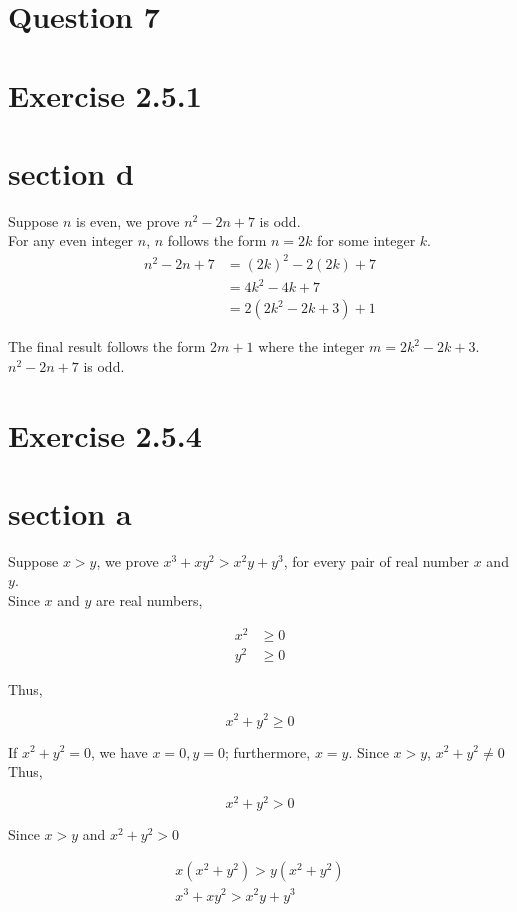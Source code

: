 \documentclass[10pt]{article}
\begin{document}
\pagebreak
\section*{Question 7}
\section*{Exercise 2.5.1}
\section*{section d}
Suppose $n$ is even, we prove $n^{2}-2 n+7$ is odd.\\
For any even integer $n$, $n$ follows the form $n=2 k$ for some integer $k$.\\

$$
\begin{aligned}
n^{2}-2 n+7 & =(2 k)^{2}-2(2 k)+7 \\
& =4 k^{2}-4 k+7 \\
& =2\left(2 k^{2}-2 k+3\right)+1
\end{aligned}
$$

The final result follows the form $2 m+1$ where the integer $m=2 k^{2}-2 k+3$. $n^{2}-2 n+7$ is odd.

\section*{Exercise 2.5.4}
\section*{section a}
Suppose $x>y$, we prove $x^{3}+x y^{2}>x^{2} y+y^{3}$, for every pair of real number $x$ and $y$.\\
Since $x$ and $y$ are real numbers,

$$
\begin{aligned}
x^{2} & \geq 0 \\
y^{2} & \geq 0
\end{aligned}
$$

Thus,

$$
x^{2}+y^{2} \geq 0
$$

If $x^{2}+y^{2}=0$, we have $x=0, y=0$; furthermore, $x=y$. Since $x>y$, $x^{2}+y^{2} \neq 0$
Thus,

$$
x^{2}+y^{2}>0
$$

Since $x>y$ and $x^{2}+y^{2}>0$

$$
\begin{array}{r}
x\left(x^{2}+y^{2}\right)>y\left(x^{2}+y^{2}\right) \\
x^{3}+x y^{2}>x^{2} y+y^{3}
\end{array}
$$
\end{document}
